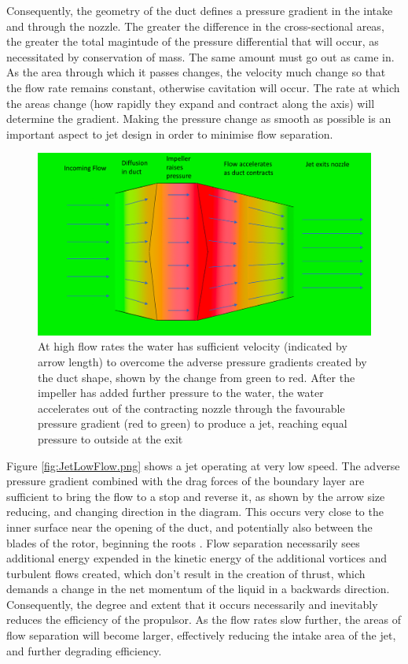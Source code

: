 \documentclass{article}\usepackage[]{graphicx}\usepackage[]{color}
\begin{document}
Consequently, the geometry of the duct defines a pressure gradient in the intake and through the nozzle.  The greater the difference in the cross-sectional areas, the greater the total magintude of the pressure differential that will occur, as necessitated by conservation of mass. The same amount must go out as came in.  As the area through which it passes changes, the velocity much change so that the flow rate remains constant, otherwise cavitation will occur.  The rate at which the areas change (how rapidly they expand and contract along the axis) will determine the gradient.  Making the pressure change as smooth as possible is an important aspect to jet design in order to minimise flow separation.

\begin{figure}[h]
\captionsetup{width=.8\textwidth}
\includegraphics[width=.8\textwidth, center]{JetHighFlow.png}
\caption{At high flow rates the water has sufficient velocity (indicated by arrow length) to overcome the adverse pressure gradients created by the duct shape, shown by the change from green to red. After the impeller has added further pressure to the water, the water accelerates out of the contracting nozzle through the favourable pressure gradient (red to green) to produce a jet, reaching equal pressure to outside at the exit}
\label{fig:JetHighFlow.png}
\end{figure}

Figure \ref{fig:JetLowFlow.png} shows a jet operating at very low speed.  The adverse pressure gradient combined with the drag forces of the boundary layer are sufficient to bring the flow to a stop and reverse it, as shown by the arrow size reducing, and changing direction in the diagram.  This occurs very close to the inner surface near the opening of the duct, and potentially also between the blades of the rotor, beginning the roots \parencite[15]{henderson1964}.  Flow separation necessarily sees additional energy expended in the kinetic energy of the additional vortices and turbulent flows created, which don't result in the creation of thrust, which demands a change in the net momentum of the liquid in a backwards direction.  Consequently, the degree and extent that it occurs necessarily and inevitably reduces the efficiency of the propulsor.  As the flow rates slow further, the areas of flow separation will become larger, effectively reducing the intake area of the jet, and further degrading efficiency.
\end{document}

